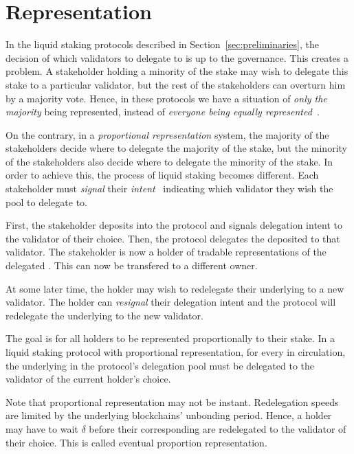 \section{Representation}

In the liquid staking protocols described in Section~\ref{sec:preliminaries},
the decision of which validators to delegate to is up to the governance.
This creates a problem. A stakeholder holding a minority of the stake
may wish to delegate this stake to a particular validator, but the rest
of the stakeholders can overturn him by a majority vote. Hence, in these
protocols we have a situation of \emph{only the majority} being represented,
instead of \emph{everyone being equally represented}~\cite{mill1862true}.

On the contrary, in a \emph{proportional representation} system, the
majority of the stakeholders decide where to delegate the majority of
the stake, but the minority of the stakeholders also decide where to delegate
the minority of the stake. In order to achieve this, the process of liquid
staking becomes different. Each stakeholder must \emph{signal} their
\emph{intent}~\cite{quicksilver} indicating which validator they wish
the pool to delegate to.

First, the stakeholder deposits \asset into the protocol and signals
delegation intent to the validator of their choice. Then, the protocol
delegates the deposited \asset to that validator. The stakeholder is
now a holder of tradable \stasset representations of the delegated \asset.
This \stasset can now be transfered to a different owner.

At some later time, the \stasset holder may wish to redelegate
their underlying \asset to a new validator.
The \stasset holder can \emph{resignal} their delegation intent and the protocol
will redelegate the underlying \asset to the new validator.

The goal is for all \stasset holders to be represented proportionally to
their stake. In a liquid staking protocol with proportional
representation, for every \stasset in circulation, the underlying \asset
in the protocol's delegation pool must be delegated to the validator
of the current \stasset holder's choice.

Note that proportional representation may not be instant. Redelegation speeds
are limited by the underlying blockchains' unbonding period.
Hence, a \stasset holder may have to wait $\delta$ before their corresponding
\assets are redelegated to the validator of their choice. This is called
eventual proportion representation.